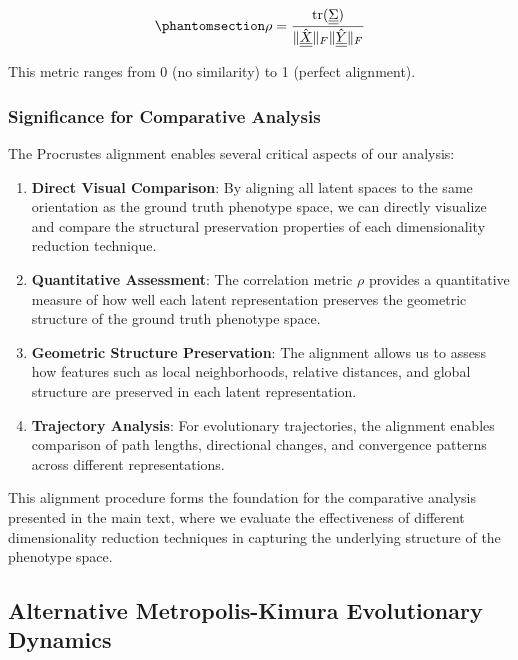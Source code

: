 \documentclass[
]{scrartcl}
\begin{document}
\begin{refsection}
\begin{equation}\phantomsection\label{eq-correlation}{
\rho = \frac{
    \text{tr}(\underline{\underline{\Sigma}})
}{
    \|\hat{\underline{\underline{X}}}\|_F\|\hat{\underline{\underline{Y}}}\|_F
}
}\end{equation}

This metric ranges from 0 (no similarity) to 1 (perfect alignment).

\subsubsection{Significance for Comparative
Analysis}\label{significance-for-comparative-analysis}

The Procrustes alignment enables several critical aspects of our
analysis:

\begin{enumerate}
\def\labelenumi{\arabic{enumi}.}
\item
  \textbf{Direct Visual Comparison}: By aligning all latent spaces to
  the same orientation as the ground truth phenotype space, we can
  directly visualize and compare the structural preservation properties
  of each dimensionality reduction technique.
\item
  \textbf{Quantitative Assessment}: The correlation metric \(\rho\)
  provides a quantitative measure of how well each latent representation
  preserves the geometric structure of the ground truth phenotype space.
\item
  \textbf{Geometric Structure Preservation}: The alignment allows us to
  assess how features such as local neighborhoods, relative distances,
  and global structure are preserved in each latent representation.
\item
  \textbf{Trajectory Analysis}: For evolutionary trajectories, the
  alignment enables comparison of path lengths, directional changes, and
  convergence patterns across different representations.
\end{enumerate}

This alignment procedure forms the foundation for the comparative
analysis presented in the main text, where we evaluate the effectiveness
of different dimensionality reduction techniques in capturing the
underlying structure of the phenotype space.

\subsection{Alternative Metropolis-Kimura Evolutionary
Dynamics}\label{sec-metropolis-kimura}


\end{refsection}
\end{document}
